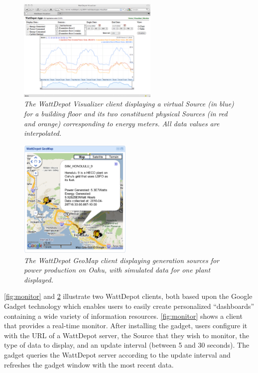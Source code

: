 \documentclass[conference]{IEEEtran}
\begin{document}
\begin{figure}[!th]
  \center
  \includegraphics[width=0.6\textwidth]{visualizer.eps}
  \caption{\em \small The WattDepot Visualizer client displaying a virtual Source
    (in blue) for a building floor and its two constituent physical Sources (in red and orange) corresponding to energy meters. All data values are interpolated.}
  \label{fig:visualizer}
\end{figure} 

\begin{figure}[thb]
  \center
  \includegraphics[width=0.48\textwidth]{geomap.eps}
  \caption{\em \small The WattDepot GeoMap client displaying generation sources 
  for power production on Oahu, with simulated data for one plant displayed.}
  \label{fig:geomap}
\end{figure}

\figurename \ref{fig:monitor} and \figurename \ref{fig:geomap} illustrate two
WattDepot clients, both based upon the Google Gadget technology which
enables users to easily create personalized ``dashboards'' containing a
wide variety of information resources.  \figurename \ref{fig:monitor} shows a
client that provides a real-time monitor.  After installing the gadget, users
configure it with the URL of a WattDepot server, the Source that they wish
to monitor, the type of data to display, and an update interval (between 5
and 30 seconds).  The gadget queries the WattDepot server according to the
update interval and refreshes the gadget window with the most recent data.
\end{document}
